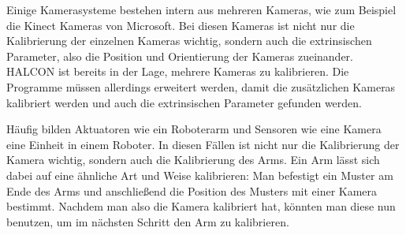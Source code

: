 Einige Kamerasysteme bestehen intern aus mehreren Kameras, wie zum Beispiel die Kinect Kameras von Microsoft. Bei diesen Kameras ist nicht nur die Kalibrierung der einzelnen Kameras wichtig, sondern auch die extrinsischen Parameter, also die Position und Orientierung der Kameras zueinander. HALCON ist bereits in der Lage, mehrere Kameras zu kalibrieren. Die Programme müssen allerdings erweitert werden, damit die zusätzlichen Kameras kalibriert werden und auch die extrinsischen Parameter gefunden werden.

Häufig bilden Aktuatoren wie ein Roboterarm und Sensoren wie eine Kamera eine Einheit in einem Roboter. In diesen Fällen ist nicht nur die Kalibrierung der Kamera wichtig, sondern auch die Kalibrierung des Arms. Ein Arm lässt sich dabei auf eine ähnliche Art und Weise kalibrieren: Man befestigt ein Muster am Ende des Arms und anschließend die Position des Musters mit einer Kamera bestimmt. Nachdem man also die Kamera kalibriert hat, könnten man diese nun benutzen, um im nächsten Schritt den Arm zu kalibrieren.